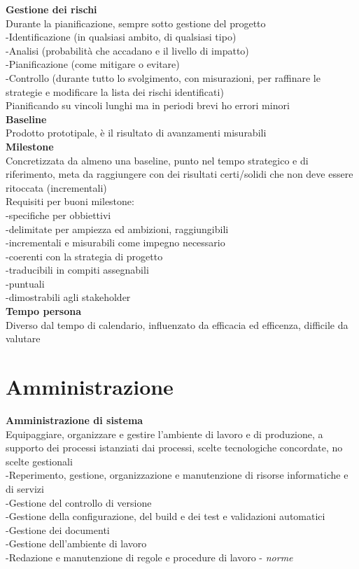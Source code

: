 \documentclass{article}
\begin{document}
			\textbf{Gestione dei rischi}\\
			Durante la pianificazione, sempre sotto gestione del progetto\\
			-Identificazione (in qualsiasi ambito, di qualsiasi tipo)\\
			-Analisi (probabilità che accadano e il livello di impatto)\\
			-Pianificazione (come mitigare o evitare)\\
			-Controllo (durante tutto lo svolgimento, con misurazioni, per raffinare le strategie e modificare la lista dei rischi identificati)\\
			Pianificando su vincoli lunghi ma in periodi brevi ho errori minori\\
			
			\textbf{Baseline}\\
			Prodotto prototipale, è il risultato di avanzamenti misurabili\\
			
			\textbf{Milestone}\\
			Concretizzata da almeno una baseline, punto nel tempo strategico e di riferimento, meta da raggiungere con dei risultati certi/solidi che non deve essere ritoccata (incrementali)\\
			Requisiti per buoni milestone:\\
			-specifiche per obbiettivi\\
			-delimitate per ampiezza ed ambizioni, raggiungibili\\
			-incrementali e misurabili come impegno necessario\\
			-coerenti con la strategia di progetto\\
			-traducibili in compiti assegnabili\\
			-puntuali\\
			-dimostrabili agli stakeholder\\
			
			\textbf{Tempo persona}\\
			Diverso dal tempo di calendario, influenzato da efficacia ed efficenza, difficile da valutare\\
		
	\clearpage
	\section{Amministrazione} 
		\textbf{Amministrazione di sistema}\\
		Equipaggiare, organizzare e gestire l'ambiente di lavoro e di produzione, a supporto dei processi istanziati dai processi, scelte tecnologiche concordate, no scelte gestionali\\
		-Reperimento, gestione, organizzazione e manutenzione di risorse informatiche e di servizi\\
		-Gestione del controllo di versione\\
		-Gestione della configurazione, del build e dei test e validazioni automatici\\
		-Gestione dei documenti\\
		-Gestione dell'ambiente di lavoro\\
		-Redazione e manutenzione di regole e procedure di lavoro - \textit{norme}\\
		
\end{document}
